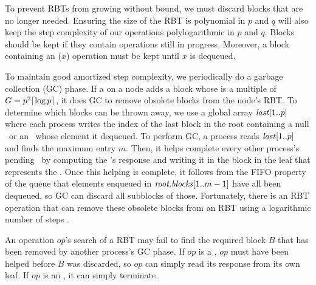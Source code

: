 To prevent RBTs from growing without bound, we must discard
blocks that are no longer needed.
Ensuring the size of the RBT is polynomial in $p$ and $q$ will 
also keep the step complexity of our operations polylogarithmic in $p$ and $q$.
Blocks should be kept if they contain operations still in progress.
Moreover, a block containing an ($x$) operation must be kept until $x$ is dequeued.

To maintain good amortized step complexity, we periodically do a garbage collection (GC) phase.
If a  on a node adds a block whose  is a multiple of $G=p^2\lceil \log p \rceil$, it does GC to remove obsolete blocks from the node's RBT.
To determine which blocks can be thrown away, we use a global array $\mbox{\textnormal{\textit{last}}}[1..p]$ where 
each process writes the index of the last block in the root
containing a null \dequeue\ or an \enqueue\ whose element it dequeued.
To perform GC, a process reads $\mbox{\textnormal{\textit{last}}}[1..p]$ and finds the maximum entry $m$.
Then, it helps complete every other process's pending \dequeue\ by 
computing the \dequeue's response and writing it in the block in the leaf that represents the \dequeue.
Once this helping is complete, it follows from the FIFO property of the queue that elements enqueued 
in $\mbox{\textit{root.blocks}}[1..m-1]$ have all been dequeued, so GC can discard all subblocks of those.
Fortunately, there is an  RBT  operation that can remove
these obsolete blocks from an RBT using a logarithmic number of steps \cite[Sec.~4.2]{Tar83}.

An operation $op$'s search of a RBT may fail to find the required block $B$ that has been removed 
by another process's GC phase.  If $op$
is a \dequeue, $op$ must have been helped before $B$ was discarded, so $op$ can simply read its response from
its own leaf.  If $op$ is an \enqueue, it can simply terminate.


